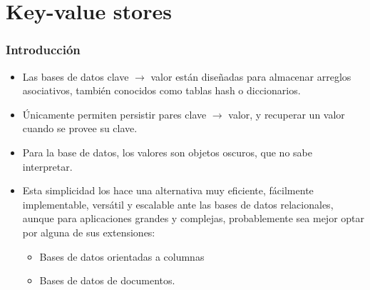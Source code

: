 \section{Key-value stores}
\begin{frame}
\frametitle{Introducción}
\begin{itemize}
\item	Las bases de datos clave $\rightarrow$ valor están diseñadas para almacenar arreglos asociativos, también conocidos como tablas hash o diccionarios. \pause
\item	Únicamente permiten persistir pares clave $\rightarrow$ valor, y recuperar un valor cuando se provee su clave. \pause
\item	Para la base de datos, los valores son objetos oscuros, que no sabe interpretar. \pause
\item	Esta simplicidad los hace una alternativa muy eficiente, fácilmente implementable, versátil y escalable ante las bases de datos relacionales, aunque para aplicaciones grandes y complejas, probablemente sea mejor optar por alguna de sus extensiones: \pause
\begin{itemize}
		\item	Bases de datos orientadas a columnas \pause
		\item	Bases de datos de documentos.
\end{itemize}
\end{itemize}
\end{frame}

